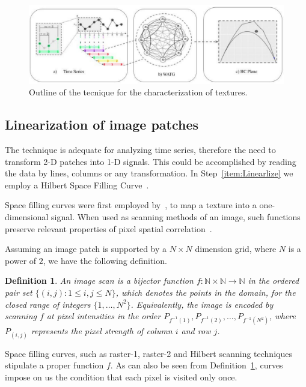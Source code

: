 \documentclass{isprs}
\begin{document}
\begin{figure}[hbt]
	\centering
	\includegraphics[scale = 0.25]{Figures/WATG.pdf}
	\caption{Outline of the tecnique for the characterization of textures.}
	\label{fig:WATG}
\end{figure}

\subsection{Linearization of image patches}

The technique is adequate for analyzing time series, therefore the need to transform 2-D patches into 1-D signals.
This could be accomplished by reading the data by lines, columns or any transformation.
In Step~\ref{item:Linearlize} we employ a Hilbert Space Filling Curve~\citep{Lee1994Texture}.

Space filling curves were first employed by~\citep{Nguyen1982SpaceFC}, to map a texture into a one-dimensional signal.
When used as scanning methods of an image, such functions preserve relevant properties of pixel spatial correlation~\citep{Lee1994Texture}.

Assuming an image patch is supported by a $N \times N$ dimension grid, where $N$ is a power of $2$, we have the following definition.

\newtheorem{mydef}{Definition}
\begin{mydef}
	An image scan is a bijector function $f \colon \mathbb{N} \times \mathbb{N} \to \mathbb{N}$ in the ordered pair set $ \{(i, j): 1 \leq i , j \leq N \}$, which denotes the points in the domain, for the closed range of integers $\{1, \dots, N^2\}$. Equivalently, the image is encoded by scanning $ f $ at pixel intensities in the order $P_{f^{-1}(1)}, P_{f^{-1}(2)}, \dots, P_{f^{-1}(N^2)}$, where $P_{(i, j)}$ represents the pixel strength of column $i$ and row $j$.
	\label{def:CurveFilling}
\end{mydef}

Space filling curves, such as raster-1, raster-2 and Hilbert scanning techniques stipulate a proper function $f$.
As can also be seen from Definition~\ref{def:CurveFilling}, curves impose on us the condition that each pixel is visited only once.
\end{document}
